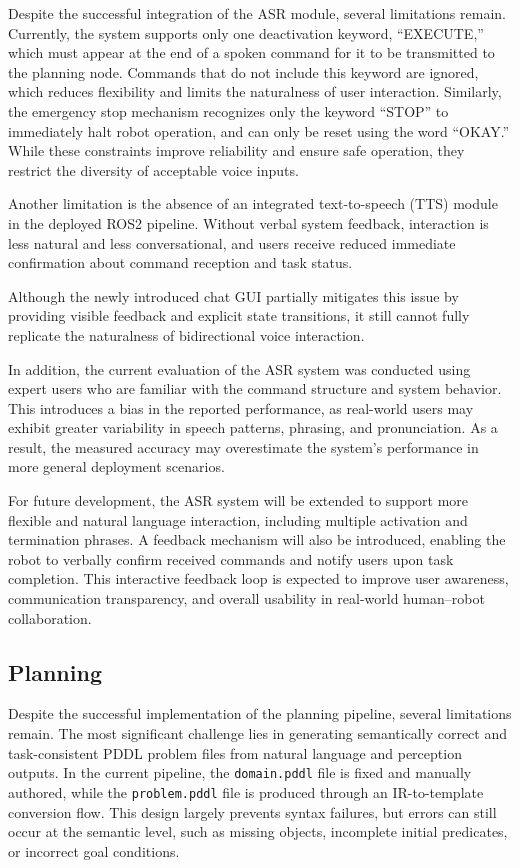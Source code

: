 \documentclass[12pt]{extarticle}
\begin{document}
Despite the successful integration of the ASR module, several limitations remain. Currently, the system supports only one deactivation keyword, ``EXECUTE,'' which must appear at the end of a spoken command for it to be transmitted to the planning node. Commands that do not include this keyword are ignored, which reduces flexibility and limits the naturalness of user interaction. Similarly, the emergency stop mechanism recognizes only the keyword ``STOP'' to immediately halt robot operation, and can only be reset using the word ``OKAY.'' While these constraints improve reliability and ensure safe operation, they restrict the diversity of acceptable voice inputs.

Another limitation is the absence of an integrated text-to-speech (TTS) module in the deployed ROS2 pipeline. Without verbal system feedback, interaction is less natural and less conversational, and users receive reduced immediate confirmation about command reception and task status.

Although the newly introduced chat GUI partially mitigates this issue by providing visible feedback and explicit state transitions, it still cannot fully replicate the naturalness of bidirectional voice interaction.

In addition, the current evaluation of the ASR system was conducted using expert users who are familiar with the command structure and system behavior. This introduces a bias in the reported performance, as real-world users may exhibit greater variability in speech patterns, phrasing, and pronunciation. As a result, the measured accuracy may overestimate the system's performance in more general deployment scenarios.

For future development, the ASR system will be extended to support more flexible and natural language interaction, including multiple activation and termination phrases. A feedback mechanism will also be introduced, enabling the robot to verbally confirm received commands and notify users upon task completion. This interactive feedback loop is expected to improve user awareness, communication transparency, and overall usability in real-world human--robot collaboration.
\subsection{Planning}
Despite the successful implementation of the planning pipeline, several limitations remain. The most significant challenge lies in generating semantically correct and task-consistent PDDL problem files from natural language and perception outputs. In the current pipeline, the \texttt{domain.pddl} file is fixed and manually authored, while the \texttt{problem.pddl} file is produced through an IR-to-template conversion flow. This design largely prevents syntax failures, but errors can still occur at the semantic level, such as missing objects, incomplete initial predicates, or incorrect goal conditions.
\end{document}
